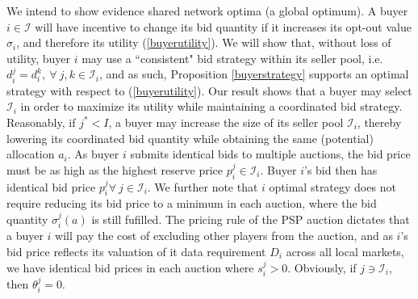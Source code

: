 \documentclass[sigconf, anonymous]{acmart}
\newcommand{\mcI}{\mathcal{I}}
\newcommand{\g}{\sigma}
\theoremstyle{definition}
\begin{document}
We intend to show evidence shared network optima (a
global optimum). 
A buyer $i\in\mcI$ will have incentive to change its bid
quantity if it increases its opt-out value $\g_i$, and therefore its utility (\ref{buyerutility}). 
We will show that, without loss of utility, buyer $i$ may  
use a ``consistent" bid strategy within its seller pool, i.e. $d_i^j = d_i^k, \
\forall \ j,k \in \mcI_i$, and as such,
Proposition \ref{buyerstrategy} supports an optimal strategy with respect to
(\ref{buyerutility}). 
Our result shows that a buyer may select $\mcI_i$ in order to maximize its
utility while maintaining a coordinated bid strategy. 
Reasonably, if $j^*< I$, a buyer may increase the size of its seller pool
$\mcI_i$, thereby lowering its coordinated bid
quantity while obtaining the same (potential) allocation $a_i$. 
As buyer $i$ submits identical bids to multiple auctions, the bid price must be
as high as the highest reserve price $p_i^j \in \mcI_i$.
Buyer $i$'s bid then has identical bid price $p_i^j \forall \ j \in\mcI_i$. 
We further note that $i$ optimal strategy does not require reducing its bid price to a
minimum in each auction, where
the bid quantity $\g_i^j(a)$ is still fufilled. The pricing rule of the PSP
auction dictates that a buyer $i$ will pay the cost of excluding other players from
the auction, and as $i$'s bid price reflects its valuation of it data
requirement $D_i$ across all local markets, we have identical bid prices in
each auction where $s_i^j>0$. Obviously, if $j\ni\mcI_i$, then $\theta_i^j = 0$.
\end{document}
